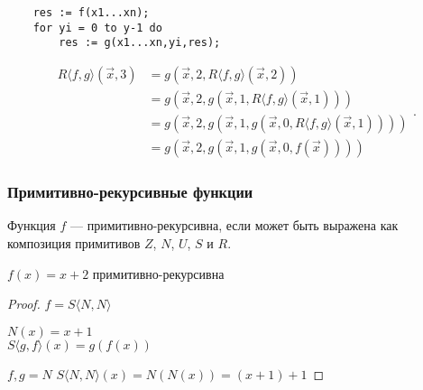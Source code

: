 \begin{verbatim}
    res := f(x1...xn);
    for yi = 0 to y-1 do
        res := g(x1...xn,yi,res);
\end{verbatim}

\begin{example}
\[ \begin{array}{ll}
    R\langle f,g\rangle(\overrightarrow{x},3) &= g(\overrightarrow{x},2,R\langle f,g\rangle(\overrightarrow{x},2)) \\
 &=   g(\overrightarrow{x},2,g(\overrightarrow{x},1,R\langle f,g\rangle(\overrightarrow{x},1))) \\
 &=   g(\overrightarrow{x},2,g(\overrightarrow{x},1,g(\overrightarrow{x},0,R\langle f,g\rangle(\overrightarrow{x},1)))) \\
 &=  g(\overrightarrow{x},2,g(\overrightarrow{x},1,g(\overrightarrow{x},0,f(\overrightarrow{x}))))
\end{array}. \]
\end{example}

\subsubsection{Примитивно-рекурсивные функции}
\begin{definition}
    Функция $f$ --- примитивно-рекурсивна, если может быть
выражена как композиция примитивов $Z$, $N$, $U$, $S$ и $R$.
\end{definition}

\begin{theorem}
$f(x) = x+2$ примитивно-рекурсивна
\end{theorem}

\begin{proof}
$f = S \langle N,N \rangle$

$N(x)=x+1$\\
$S\langle g,f\rangle (x) = g(f(x))$

$f, g = N$
$S\langle N,N\rangle (x) = N(N(x)) = (x+1)+1$
\end{proof}

